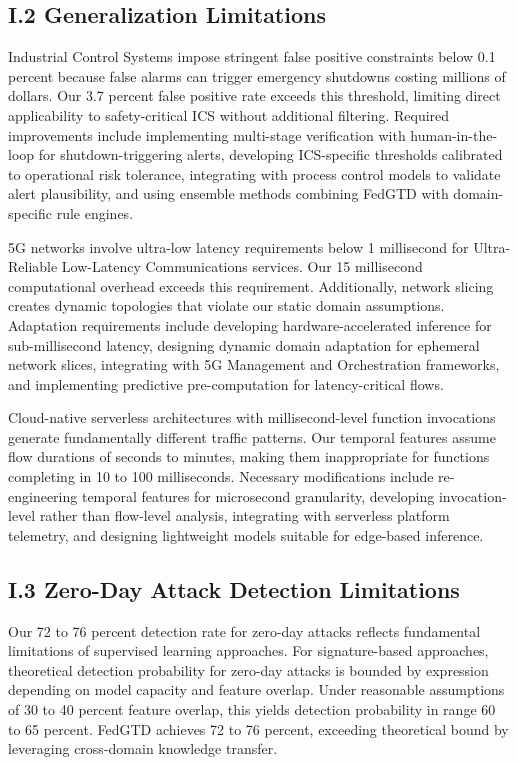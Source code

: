\documentclass[12pt,a4paper]{article}
\theoremstyle{definition}
\begin{document}
\par\endgroup

\subsection{I.2 Generalization Limitations}

Industrial Control Systems impose stringent false positive constraints below 0.1 percent because false alarms can trigger emergency shutdowns costing millions of dollars. Our 3.7 percent false positive rate exceeds this threshold, limiting direct applicability to safety-critical ICS without additional filtering. Required improvements include implementing multi-stage verification with human-in-the-loop for shutdown-triggering alerts, developing ICS-specific thresholds calibrated to operational risk tolerance, integrating with process control models to validate alert plausibility, and using ensemble methods combining FedGTD with domain-specific rule engines.

5G networks involve ultra-low latency requirements below 1 millisecond for Ultra-Reliable Low-Latency Communications services. Our 15 millisecond computational overhead exceeds this requirement. Additionally, network slicing creates dynamic topologies that violate our static domain assumptions. Adaptation requirements include developing hardware-accelerated inference for sub-millisecond latency, designing dynamic domain adaptation for ephemeral network slices, integrating with 5G Management and Orchestration frameworks, and implementing predictive pre-computation for latency-critical flows.

Cloud-native serverless architectures with millisecond-level function invocations generate fundamentally different traffic patterns. Our temporal features assume flow durations of seconds to minutes, making them inappropriate for functions completing in 10 to 100 milliseconds. Necessary modifications include re-engineering temporal features for microsecond granularity, developing invocation-level rather than flow-level analysis, integrating with serverless platform telemetry, and designing lightweight models suitable for edge-based inference.

\subsection{I.3 Zero-Day Attack Detection Limitations}

Our 72 to 76 percent detection rate for zero-day attacks reflects fundamental limitations of supervised learning approaches. For signature-based approaches, theoretical detection probability for zero-day attacks is bounded by expression depending on model capacity and feature overlap. Under reasonable assumptions of 30 to 40 percent feature overlap, this yields detection probability in range 60 to 65 percent. FedGTD achieves 72 to 76 percent, exceeding theoretical bound by leveraging cross-domain knowledge transfer.
\end{document}
